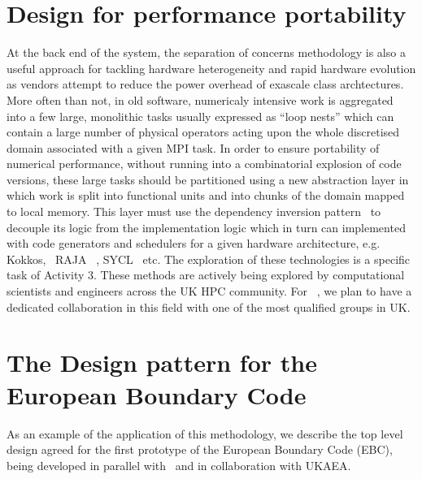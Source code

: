 \documentclass{article}
\begin{document}
\section*{{\Large{}{ \textbf{Design for performance portability}}}}

At the back end of the system, the separation of concerns methodology is also a 
useful approach for tackling hardware heterogeneity and rapid hardware evolution 
as vendors attempt to reduce the power overhead of exascale class archtectures. 
More often than not, in old software, numericaly intensive work is aggregated into 
a few large, monolithic tasks usually expressed as ``loop nests'' which can contain 
a large number of physical operators acting upon the whole discretised domain associated 
with a given MPI task. In order to ensure portability of numerical performance, 
without running into a combinatorial explosion of code versions, these large tasks 
should be partitioned using a new abstraction layer in which work is split into 
functional units and into chunks of the domain mapped to local memory. This layer 
must use the dependency inversion pattern~\cite{ref [11]} to decouple its logic from the implementation 
logic which in turn can implemented with code generators and schedulers for a given 
hardware architecture, e.g. Kokkos,~\cite{ref [12]} RAJA~\cite{ref [13]} , SYCL~\cite{ref [14]} etc. The exploration 
of these technologies is a specific task of Activity 3. These methods are actively 
being explored by computational scientists and engineers across the UK HPC community. 
For \nep \  , we plan to have a dedicated collaboration in this field with one of 
the most qualified groups in UK.

\section*{{\Large{}{ \textbf{The Design pattern for the European 
Boundary Code}}}}

As an example of the application of this methodology, we describe the top level 
design agreed for the first prototype of the European Boundary Code (EBC), being 
developed in parallel with \nep \   and in collaboration with UKAEA. 
\end{document}

